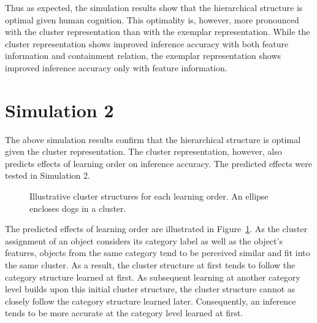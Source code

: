 \documentclass[doc]{apa6}
\begin{document}
Thus as expected, the simulation results show that the hierarchical structure is optimal given human
cognition. This optimality is, however, more pronounced with the cluster representation than with
the exemplar representation. While the cluster representation shows improved inference accuracy with
both feature information and containment relation, the exemplar representation shows improved
inference accuracy only with feature information.


\section*{Simulation 2}

The above simulation results confirm that the hierarchical structure is optimal given the cluster
representation. The cluster representation, however, also predicts effects of learning order on
inference accuracy. The predicted effects were tested in Simulation 2.

\begin{figure}
    \centering



    \vspace{10pt}

    \caption{Illustrative cluster structures for each learning order. An ellipse encloses dogs in a
    cluster.}

\label{fig:learning_order}
\end{figure}

The predicted effects of learning order are illustrated in Figure~\ref{fig:learning_order}. As the
cluster assignment of an object considers its category label as well as the object's features,
objects from the same category tend to be perceived similar and fit into the same cluster. As a
result, the cluster structure at first tends to follow the category structure learned at first.
As subsequent learning at another category level builds upon this initial cluster structure, the
cluster structure cannot as closely follow the category structure learned later. Consequently, an
inference tends to be more accurate at the category level learned at first.
\end{document}
